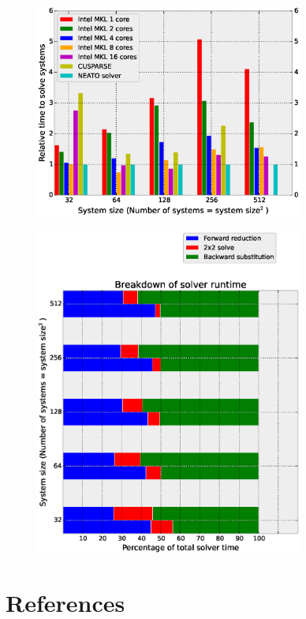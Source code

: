 \documentclass{elsarticle}
\begin{document}
\begin{figure}[h!]
\begin{center}
\includegraphics[width=250pt]{fig/bench-3d.eps}
\end{center}
\label{fig:k20-bench-3d}
\end{figure}


\begin{figure}[h!]
\begin{center}
\includegraphics[width=250pt]{fig/phases-analysis.eps}
\end{center}
\label{fig:k20-forward-vs-backward}
\end{figure}



\pagebreak
\section*{References}



\end{document}
